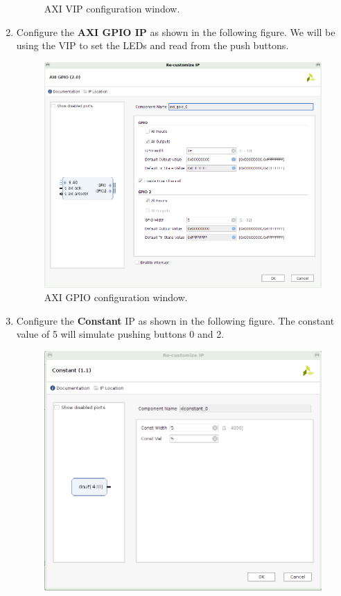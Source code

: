 \documentclass[12pt]{article}
\begin{document}
\begin{enumerate}
\begin{figure}[H]
		  \caption{AXI VIP configuration window.}
		  \label{fig:naxivipconfig}
		\end{figure}
	\item Configure the \textbf{AXI GPIO IP} as shown in the following figure. We will be using the VIP to set the LEDs and read from the push buttons.
		\begin{figure}[H]
		  \centering
		  \includegraphics[scale=0.5]{naxigpioconfig.png}
		  \caption{AXI GPIO configuration window.}
		  \label{fig:naxigpioconfig}
		\end{figure}
	\item Configure the \textbf{Constant} IP as shown in the following figure. The constant value of 5 will simulate pushing buttons 0 and 2.
		\begin{figure}[H]
		  \centering
		  \includegraphics[scale=0.5]{naxiconstantconfig.png}

\end{figure}
\end{enumerate}
\end{document}
